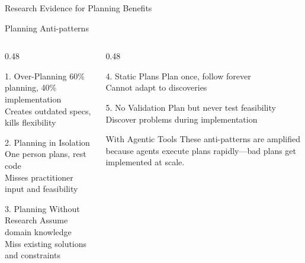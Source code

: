 \documentclass[aspectratio=169,10pt]{beamer}
\begin{document}
\begin{frame}{Research Evidence for Planning Benefits}
\end{frame}

\begin{frame}{Planning Anti-patterns}
    \begin{columns}[T]
        \begin{column}{0.48\textwidth}
            \begin{alertblock}{1. Over-Planning}
                60\% planning, 40\% implementation\\
                Creates outdated specs, kills flexibility
            \end{alertblock}
            \begin{alertblock}{2. Planning in Isolation}
                One person plans, rest code\\
                Misses practitioner input and feasibility
            \end{alertblock}
            \begin{alertblock}{3. Planning Without Research}
                Assume domain knowledge\\
                Miss existing solutions and constraints
            \end{alertblock}
        \end{column}
        \begin{column}{0.48\textwidth}
            \begin{alertblock}{4. Static Plans}
                Plan once, follow forever\\
                Cannot adapt to discoveries
            \end{alertblock}
            \begin{alertblock}{5. No Validation}
                Plan but never test feasibility\\
                Discover problems during implementation
            \end{alertblock}
            \vspace{0.3cm}
            \begin{block}{With Agentic Tools}
                These anti-patterns are amplified because agents execute plans rapidly---bad plans get implemented at scale.
            \end{block}
        \end{column}
    \end{columns}

\end{frame}
\end{document}
